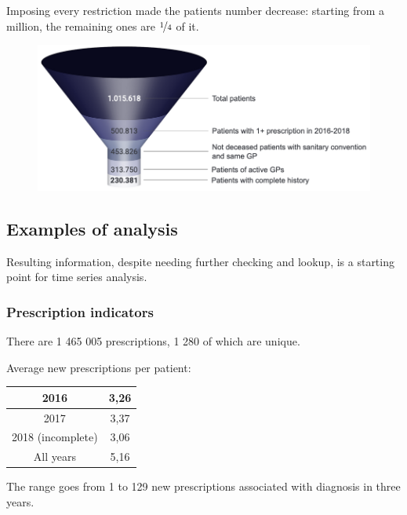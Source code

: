 Imposing every restriction made the patients number decrease: starting from a million, the remaining ones are $\nicefrac{1}{4}$ of it.
\begin{figure}[h]
	\centering
	\includegraphics[scale=0.5]{images/funnel.png}
\end{figure}

\subsection{Examples of analysis}
Resulting information, despite needing further checking and lookup, is a starting point for time series analysis.

\subsubsection{Prescription indicators}
There are 1 465 005 prescriptions, 1 280 of which are unique.

Average new prescriptions per patient:
\begin{center}
	\small
	\begin{tabular}{c|c}
		2016 & 3,26 \\
		\hline
		2017 & 3,37 \\
		\hline
		2018 (incomplete) & 3,06 \\
		\hline
		All years & 5,16
	\end{tabular}
\end{center}

The range goes from 1 to 129 new prescriptions associated with diagnosis in three years.

